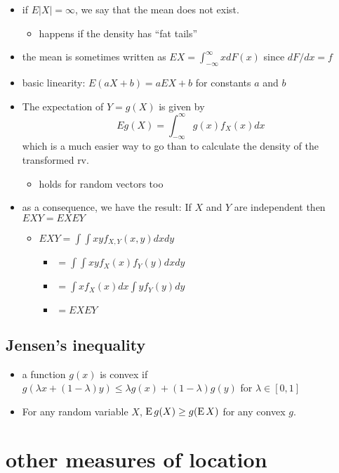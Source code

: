 \begin{itemize}
\item if $E|X| = \infty$, we say that the mean does not exist.
\begin{itemize}
\item happens if the density has ``fat tails''
\end{itemize}
\item the mean is sometimes written as $EX = \int_{-\infty}^{\infty} x
       dF(x)$ since $dF/dx = f$
\item basic linearity: $E(a X + b) = a E X + b$ for constants $a$
       and $b$
\item The expectation of $Y = g(X)$ is given by \[ E g(X) =
       \int_{-\infty}^\infty g(x) f_X(x) dx \] which is a much
       easier way to go than to calculate the density
       of the transformed rv.
\begin{itemize}
\item holds for random vectors too
\end{itemize}
\item as a consequence, we have the result: If $X$ and $Y$ are
       independent then $E XY = EX E Y$
\begin{itemize}
\item $EXY = \int\int x y f_{X,Y}(x,y) dx dy$
\begin{itemize}
\item $= \int\int xy f_X(x) f_Y(y) dx dy$
\item $= \int x f_X(x) dx \int y f_Y(y) dy$
\item $= EX EY$
\end{itemize}
\end{itemize}
\end{itemize}
\subsection{Jensen's inequality}
\label{sec-1-5}

\begin{itemize}
\item a function $g(x)$ is convex if $g(\lambda x + (1-\lambda)y)
       \leq \lambda g(x) + (1-\lambda) g(y)$ for $\lambda \in [0,1]$
\item For any random variable $X$, $\operatorname{E} g(X) \geq g(\operatorname{E} X)$ for any
       convex $g$.
\end{itemize}
\section{other measures of location}
\label{sec-2}

